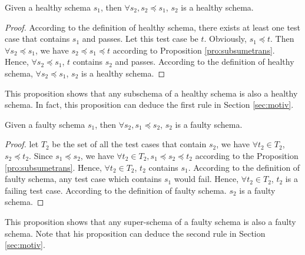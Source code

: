\begin{proposition}\label{pro:subofhealthy}
Given a healthy schema $s_{1}$, then $\forall s_{2}, s_{2} \preceq s_{1}$, $s_{2}$ is a healthy schema.
\end{proposition}

\begin{proof}
According to the definition of healthy schema,  there exists at least one test case that contains $s_{1}$ and passes. Let this test case be $t$. Obviously, $s_{1} \preceq t$.  Then $\forall s_{2} \preceq  s_{1}$, we have $s_{2} \preceq s_{1} \preceq t$ according to Proposition \ref{pro:subsumetrans}. Hence, $\forall s_{2} \preceq  s_{1}$,  $t$ contains $s_{2}$ and passes. According to the definition of healthy schema, $\forall s_{2} \preceq  s_{1}$, $s_{2}$ is a healthy schema.
\end{proof}

This proposition shows that any subschema of a healthy schema is also a healthy schema. In fact, this proposition can deduce the first rule in Section \ref{sec:motiv}.


\begin{proposition}\label{pro:superoffaulty}
Given a faulty schema $s_{1}$, then $\forall s_{2}, s_{1} \preceq s_{2}$, $s_{2}$ is a faulty schema.
\end{proposition}

\begin{proof}
let $T_{2}$ be the set of all the test cases that contain $s_{2}$, we have $\forall t_{2} \in T_{2}$, $s_{2} \preceq t_{2}$.  Since $s_{1} \preceq s_{2}$, we have $\forall t_{2} \in T_{2}, s_{1} \preceq s_{2} \preceq t_{2}$ according to the Proposition \ref{pro:subsumetrans}. Hence, $\forall t_{2} \in T_{2}$, $t_{2}$ contains $s_{1}$. According to the definition of faulty schema, any test case which contains $s_{1}$ would fail. Hence, $\forall t_{2} \in T_{2}$, $t_{2}$ is a failing test case. According to the definition of faulty schema. $s_{2}$ is a faulty schema.
\end{proof}

This proposition shows that any super-schema of a faulty schema is also a faulty schema.  Note that his proposition can deduce the second rule in Section \ref{sec:motiv}.


